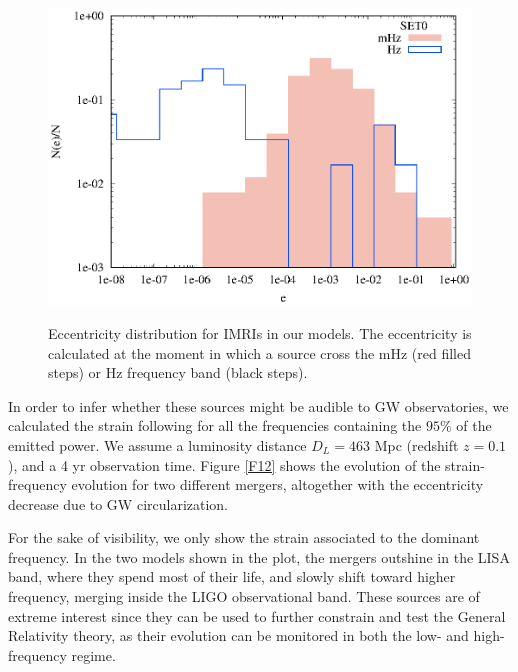 \documentclass[twocolumn]{aastex62}
\begin{document}
 
\begin{figure}
\centering
\includegraphics[width=\columnwidth]{mergers_eccen}\\
\caption{Eccentricity distribution for IMRIs in our models. The eccentricity is calculated at the moment in which a source cross the mHz (red filled steps) or Hz frequency band (black steps).}
\label{F11}
\end{figure}

In order to infer whether these sources might be audible to GW observatories, we calculated the strain following \cite{kocsis12} for all the frequencies containing the $95\%$ of the emitted power. We assume a luminosity distance $D_L = 463$ Mpc (redshift $z=0.1$), and a 4 yr observation time. Figure \ref{F12} shows the evolution of the strain-frequency evolution for two different mergers, altogether with the eccentricity decrease due to GW circularization.

For the sake of visibility, we only show the strain associated to the dominant frequency. In the two models shown in the plot, the mergers outshine in the LISA band, where they spend most of their life, and slowly shift toward higher frequency, merging inside the LIGO observational band. These sources are of extreme interest since they can be used to further constrain and test the General Relativity theory, as their evolution can be monitored in both the low- and high-frequency regime. 
\end{document}
